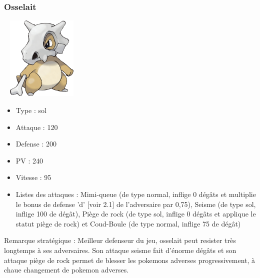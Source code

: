 		\subsubsection{Osselait}
            \begin{center}
				\includegraphics[width=4cm,height=4cm]{images/osselait}
			\end{center}
			\begin{itemize}
				\item Type : sol
				\item Attaque : 120
				\item Defense : 200
				\item PV : 240
				\item Vitesse : 95
				\item Listes des attaques : Mimi-queue (de type normal, inflige 0 dégâts et multiplie le bonus de defense 'd' [voir 2.1] de l'adversaire par 0,75), Seisme (de type sol, inflige 100 de dégât), Piège de rock (de type sol, inflige 0 dégâts et applique le statut piège de rock) et Coud-Boule (de type normal, inflige 75 de dégât)
			\end{itemize}
			Remarque stratégique : Meilleur defenseur du jeu, osselait peut resister très longtemps à ses adversaires. Son attaque seisme fait d'énorme dégâts et son attaque piège de rock permet de blesser les pokemons adverses progressivement, à chaue changement de pokemon adverses.
